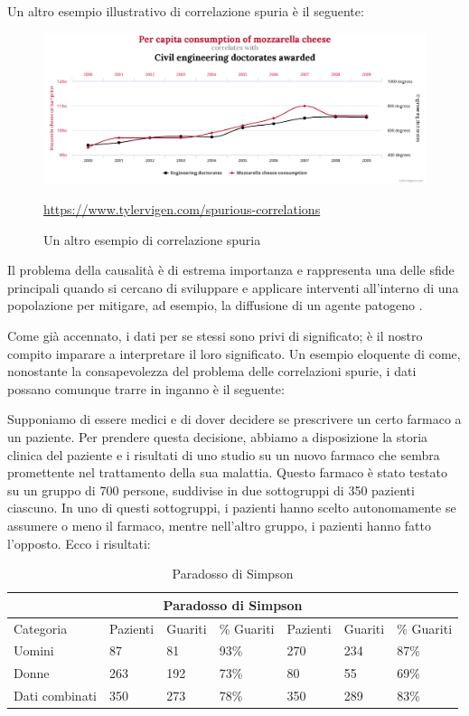 Un altro esempio illustrativo di correlazione spuria è il seguente:

\begin{figure}[H]
    \begin{center}
        \includegraphics[width=\linewidth]{img/chart1.png}
        \caption{Un altro esempio di correlazione spuria}
        \url{https://www.tylervigen.com/spurious-correlations}
        \label{fig:another_spurious_relations}
    \end{center}
\end{figure}

Il problema della causalità è di estrema importanza e rappresenta 
una delle sfide principali quando si cercano di sviluppare e 
applicare interventi all'interno di una popolazione per mitigare, 
ad esempio, la diffusione di un agente patogeno \cite{Parascandola2001-kw}.

Come già accennato, i dati per se stessi sono privi di significato; 
è il nostro compito imparare a interpretare il loro significato. 
Un esempio eloquente di come, nonostante la consapevolezza del problema 
delle correlazioni spurie, i dati possano comunque trarre in inganno 
è il seguente:

Supponiamo di essere medici e di dover decidere se prescrivere un 
certo farmaco a un paziente. Per prendere questa decisione, abbiamo 
a disposizione la storia clinica del paziente e i risultati di uno 
studio su un nuovo farmaco che sembra promettente nel trattamento 
della sua malattia. Questo farmaco è stato testato su un gruppo di 
700 persone, suddivise in due sottogruppi di 350 pazienti ciascuno. 
In uno di questi sottogruppi, i pazienti hanno scelto autonomamente se 
assumere o meno il farmaco, mentre nell'altro gruppo, i pazienti hanno 
fatto l'opposto. Ecco i risultati:

\begin{table}[H]
    \centering
    \caption{Paradosso di Simpson}
    \begin{tabular}{ |p{2.2cm}||p{1.6cm}|p{1.6cm}|p{1.6cm}||p{1.6cm}|p{1.6cm}|p{1.6cm}| }
        \hline
        \multicolumn{7}{|c|}{Paradosso di Simpson} \\
        \hline
        Categoria & Pazienti & Guariti & \% Guariti & Pazienti & Guariti & \% Guariti\\
        \hline
        Uomini & 87 & 81 & 93\% & 270 & 234 & 87\% \\
        Donne & 263 & 192 & 73\% & 80 & 55 & 69\% \\
        Dati combinati & 350 & 273 & 78\% & 350 & 289 & 83\% \\
        \hline
    \end{tabular}
\end{table}

